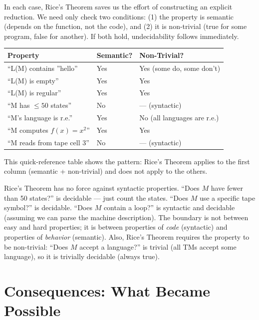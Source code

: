 In each case, Rice's Theorem saves us the effort of constructing an explicit reduction. We need only check two conditions: (1) the property is semantic (depends on the function, not the code), and (2) it is non-trivial (true for some program, false for another). If both hold, undecidability follows immediately.

\begin{center}
\begin{tabularx}{0.95\textwidth}{|l|l|l|}
\hline
\textbf{Property} & \textbf{Semantic?} & \textbf{Non-Trivial?} \\
\hline
``L(M) contains ''hello'' & Yes & Yes (some do, some don't) \\
``L(M) is empty'' & Yes & Yes \\
``L(M) is regular'' & Yes & Yes \\
``M has $\leq 50$ states'' & No & --- (syntactic) \\
``M's language is r.e.'' & Yes & No (all languages are r.e.) \\
``M computes $f(x)=x^2$'' & Yes & Yes \\
``M reads from tape cell 3'' & No & --- (syntactic) \\
\hline
\end{tabularx}
\end{center}

This quick-reference table shows the pattern: Rice's Theorem applies to the first column (semantic + non-trivial) and does not apply to the others.

Rice's Theorem has no force against syntactic properties. ``Does $M$ have fewer than 50 states?'' is decidable --- just count the states. ``Does $M$ use a specific tape symbol?'' is decidable. ``Does $M$ contain a loop?'' is syntactic and decidable (assuming we can parse the machine description). The boundary is not between easy and hard properties; it is between properties of \emph{code} (syntactic) and properties of \emph{behavior} (semantic). Also, Rice's Theorem requires the property to be non-trivial: ``Does $M$ accept a language?'' is trivial (all TMs accept some language), so it is trivially decidable (always true).

\section{Consequences: What Became Possible}
\label{sec:rice:consequences}

